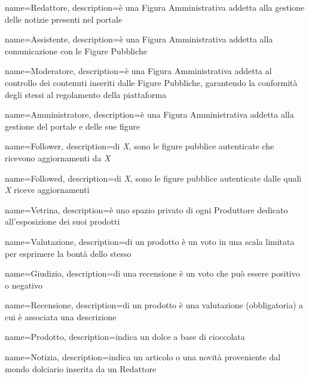 {
    name={Redattore},
    description={è una Figura Amministrativa addetta alla gestione delle notizie presenti nel portale}
}

{
    name={Assistente},
    description={è una Figura Amministrativa addetta alla comunicazione con le Figure Pubbliche}
}

{
    name={Moderatore},
    description={è una Figura Amministrativa addetta al controllo dei contenuti inseriti dalle Figure Pubbliche, garantendo la conformità degli stessi al regolamento della piattaforma}
}

{
    name={Amministratore},
    description={è una Figura Amministrativa addetta alla gestione del portale e delle sue figure}
}

{
    name={Follower},
    description={di \emph{X}, sono le figure pubblice autenticate che ricevono aggiornamenti da \emph{X}}
}

{
    name={Followed},
    description={di \emph{X}, sono le figure pubblice autenticate dalle quali \emph{X} riceve aggiornamenti}
}

{
    name={Vetrina},
    description={è uno spazio privato di ogni Produttore dedicato all'esposizione dei suoi prodotti}
}

{
    name={Valutazione},
    description={di un prodotto è un voto in una scala limitata per esprimere la bontà dello stesso}
}

{
    name={Giudizio},
    description={di una recensione è un voto che può essere positivo o negativo}
}

{
    name={Recensione},
    description={di un prodotto è una valutazione (obbligatoria) a cui è associata una descrizione}
}

{
    name={Prodotto},
    description={indica un dolce a base di cioccolata}
}

{
    name={Notizia},
    description={indica un articolo o una novità proveniente dal mondo dolciario inserita da un Redattore}
}




